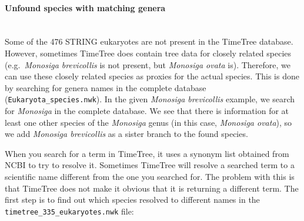 \hypertarget{unfound-species-with-matching-genera}{%
\paragraph{\texorpdfstring{\textbf{Unfound species with matching
genera}}{Unfound species with matching genera}}\label{unfound-species-with-matching-genera}}

\texttt{}\\
Some of the 476 STRING eukaryotes are not present in the TimeTree
database. However, sometimes TimeTree does contain tree data for closely
related species (e.g.~\emph{Monosiga brevicollis} is not present, but
\emph{Monosiga ovata} is). Therefore, we can use these closely related
species as proxies for the actual species. This is done by searching for
genera names in the complete database (\texttt{Eukaryota\_species.nwk}).
In the given \emph{Monosiga brevicollis} example, we search for
\emph{Monosiga} in the complete database. We see that there is
information for at least one other species of the \emph{Monosiga} genus
(in this case, \emph{Monosiga ovata}), so we add \emph{Monosiga
brevicollis} as a sister branch to the found species.

When you search for a term in TimeTree, it uses a synonym list obtained
from NCBI to try to resolve it. Sometimes TimeTree will resolve a
searched term to a scientific name different from the one you searched
for. The problem with this is that TimeTree does not make it obvious
that it is returning a different term. The first step is to find out
which species resolved to different names in the
\texttt{timetree\_335\_eukaryotes.nwk} file:

\begin{Shaded}
\end{Shaded}

